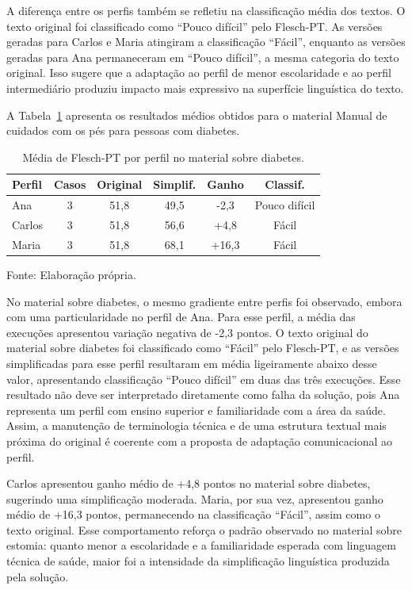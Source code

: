 A diferença entre os perfis também se refletiu na classificação média dos textos. O texto original foi classificado como ``Pouco difícil'' pelo Flesch-PT. As versões geradas para Carlos e Maria atingiram a classificação ``Fácil'', enquanto as versões geradas para Ana permaneceram em ``Pouco difícil'', a mesma categoria do texto original. Isso sugere que a adaptação ao perfil de menor escolaridade e ao perfil intermediário produziu impacto mais expressivo na superfície linguística do texto.

A Tabela~\ref{tab:flesch-diabetes} apresenta os resultados médios obtidos para o material Manual de cuidados com os pés para pessoas com diabetes.

\begin{table}[htbp]
  \centering
  \caption{Média de Flesch-PT por perfil no material sobre diabetes.}
  \label{tab:flesch-diabetes}
  \small
  \renewcommand{\arraystretch}{1.15}
  \begin{tabular}{lccccc}
    \hline
    \textbf{Perfil} & \textbf{Casos} & \textbf{Original} & \textbf{Simplif.} & \textbf{Ganho} & \textbf{Classif.} \\
    \hline
    Ana    & 3 & 51,8 & 49,5 & -2,3 & Pouco difícil \\
    Carlos & 3 & 51,8 & 56,6 & +4,8   & Fácil \\
    Maria  & 3 & 51,8 & 68,1 & +16,3  & Fácil \\
    \hline
  \end{tabular}

  {\footnotesize Fonte: Elaboração própria.}
\end{table}

No material sobre diabetes, o mesmo gradiente entre perfis foi observado, embora com uma particularidade no perfil de Ana. Para esse perfil, a média das execuções apresentou variação negativa de -2,3 pontos. O texto original do material sobre diabetes foi classificado como ``Fácil'' pelo Flesch-PT, e as versões simplificadas para esse perfil resultaram em média ligeiramente abaixo desse valor, apresentando classificação ``Pouco difícil'' em duas das três execuções. Esse resultado não deve ser interpretado diretamente como falha da solução, pois Ana representa um perfil com ensino superior e familiaridade com a área da saúde. Assim, a manutenção de terminologia técnica e de uma estrutura textual mais próxima do original é coerente com a proposta de adaptação comunicacional ao perfil.

Carlos apresentou ganho médio de +4,8 pontos no material sobre diabetes, sugerindo uma simplificação moderada. Maria, por sua vez, apresentou ganho médio de +16,3 pontos, permanecendo na classificação ``Fácil'', assim como o texto original. Esse comportamento reforça o padrão observado no material sobre estomia: quanto menor a escolaridade e a familiaridade esperada com linguagem técnica de saúde, maior foi a intensidade da simplificação linguística produzida pela solução.

